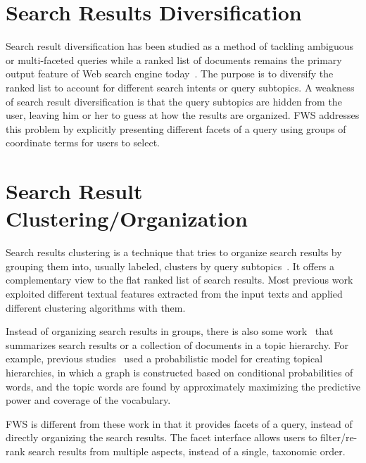 \section{Search Results Diversification}
Search result diversification has been studied as a method of tackling ambiguous or multi-faceted queries while a ranked list of documents remains the primary output feature of Web search engine today~\cite{agrawal2009diversifying,clarke2008novelty,santos2010exploiting,sakai2011evaluating,dang2013term}.
The purpose is to diversify the ranked list to account for different search intents or query subtopics.
A weakness of search result diversification is that the query subtopics are hidden from the user, leaving him or her to guess at how the results are organized.
FWS addresses this problem by explicitly presenting different facets of a query using groups of coordinate terms for users to select.

\section{Search Result Clustering/Organization}
Search results clustering is a technique that tries to organize search results by grouping them into, usually labeled, clusters by query subtopics~\cite{carpineto2009survey}.
It offers a complementary view to the flat ranked list of search results.
Most previous work exploited different textual features extracted from the input texts and applied different clustering algorithms with them.

Instead of organizing search results in groups, there is also some work~\cite{lawrie2001finding,lawrie2003generating, nevill1999lexically} that summarizes search results or a collection of documents in a topic hierarchy. For example, previous studies~\cite{lawrie2001finding,lawrie2003generating} used a probabilistic model for creating topical hierarchies, in which a graph is constructed based on conditional probabilities of words, and the topic words are found by approximately maximizing the predictive power and coverage of the vocabulary.

FWS is different from these work in that it provides facets of a query, instead of directly organizing the search results. The facet interface allows users to filter/re-rank search results from multiple aspects, instead of a single, taxonomic order.

